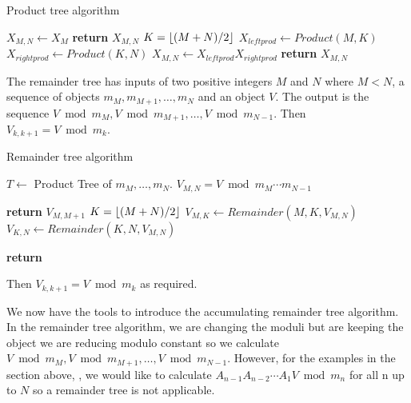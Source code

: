 \begin{algorithm}
\caption{Product tree algorithm}\label{product}
\begin{algorithmic}
	\State $X_{M,N} \gets X_M$
	\State \textbf{return} $X_{M,N}$
\Else 
	\State $K=\lfloor(M+N)/2\rfloor$
	\State $X_{leftprod} \gets Product(M,K)$
	\State $X_{rightprod} \gets Product(K,N)$
	\State $X_{M,N} \gets X_{leftprod}X_{rightprod} $
	\State \textbf{return} $X_{M,N}$

\EndIf
\EndProcedure
\end{algorithmic}
\end{algorithm}

The remainder tree has inputs of two positive integers $M$ and $N$ where $M< N$, a sequence of objects $m_M, m_{M+1},\dots,m_{N}$ and an object $V$. The output is the sequence $V \bmod m_M, V\bmod m_{M+1},\dots, V \bmod m_{N-1}$.
Then $V_{k,k+1}=V\bmod m_k$.

  
\begin{algorithm}[H]
\caption{Remainder tree algorithm}\label{remainder}
\begin{algorithmic}

\State $T\gets$ Product Tree of $m_M,\dots, m_N$. 
\State $V_{M,N}=V \bmod m_{M}\cdots m_{N-1}$ 
 
	\State 
	\State \textbf{return} $V_{M,M+1}$
\Else 
	\State $K=\lfloor(M+N)/2\rfloor$
	\State $V_{M,K} \gets Remainder(M,K,V_{M,N})$
	\State $V_{K,N} \gets Remainder(K,N,V_{M,N})$
	
	\State \textbf{return} 

\EndIf
\EndProcedure
\end{algorithmic}
\end{algorithm}

Then $V_{k,k+1}=V\bmod m_k$ as required.

We now have the tools to introduce the accumulating remainder tree algorithm. In the remainder tree algorithm, we are changing the moduli but are keeping the object we are reducing modulo constant so we calculate $V\bmod m_{M}, V\bmod m_{M+1}, \dots, V \bmod m_{N-1}$. However, for the examples in the section above, , we would like to calculate $A_{n-1}A_{n-2}\cdots A_{1}V\bmod m_{n}$ for all n up to $N$ so a remainder tree is not applicable. 


